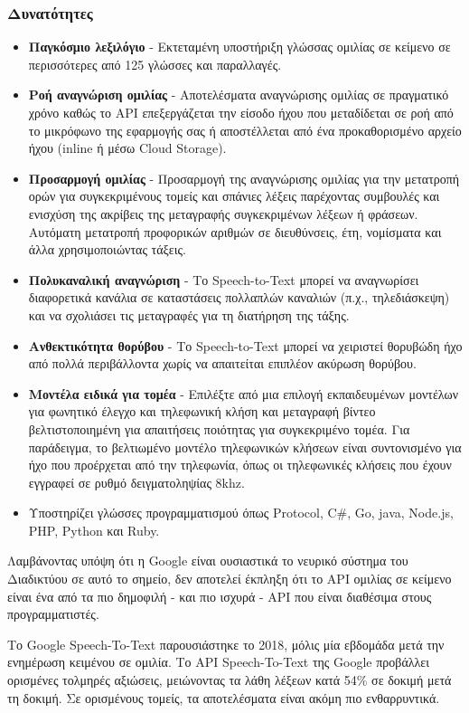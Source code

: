 \documentclass[oneside, 12pt]{book}
\begin{document}
\subsubsection{Δυνατότητες}
\begin{itemize}
  \item \textbf{Παγκόσμιο λεξιλόγιο} - Εκτεταμένη υποστήριξη γλώσσας ομιλίας σε κείμενο σε περισσότερες από 125 γλώσσες και παραλλαγές.
  \item \textbf{Ροή αναγνώριση ομιλίας} - Αποτελέσματα αναγνώρισης ομιλίας σε πραγματικό χρόνο καθώς το API επεξεργάζεται την είσοδο ήχου που μεταδίδεται σε ροή από το μικρόφωνο της εφαρμογής σας ή αποστέλλεται από ένα προκαθορισμένο αρχείο ήχου (inline ή μέσω Cloud Storage).
  \item \textbf{Προσαρμογή ομιλίας} - Προσαρμογή της αναγνώρισης ομιλίας για την μετατροπή ορών για συγκεκριμένους τομείς και σπάνιες λέξεις παρέχοντας συμβουλές και ενισχύση της ακρίβεις της μεταγραφής συγκεκριμένων λέξεων ή φράσεων. Αυτόματη μετατροπή προφορικών αριθμών σε διευθύνσεις, έτη, νομίσματα και άλλα χρησιμοποιώντας τάξεις.
  \item \textbf{Πολυκαναλική αναγνώριση} - Το Speech-to-Text μπορεί να αναγνωρίσει διαφορετικά κανάλια σε καταστάσεις πολλαπλών καναλιών (π.χ., τηλεδιάσκεψη) και να σχολιάσει τις μεταγραφές για τη διατήρηση της τάξης.
  \item \textbf{Ανθεκτικότητα θορύβου} - Το Speech-to-Text μπορεί να χειριστεί θορυβώδη ήχο από πολλά περιβάλλοντα χωρίς να απαιτείται επιπλέον ακύρωση θορύβου.
  \item \textbf{Μοντέλα ειδικά για τομέα} - Επιλέξτε από μια επιλογή εκπαιδευμένων μοντέλων για φωνητικό έλεγχο και τηλεφωνική κλήση και μεταγραφή βίντεο βελτιστοποιημένη για απαιτήσεις ποιότητας για συγκεκριμένο τομέα. Για παράδειγμα, το βελτιωμένο μοντέλο τηλεφωνικών κλήσεων είναι συντονισμένο για ήχο που προέρχεται από την τηλεφωνία, όπως οι τηλεφωνικές κλήσεις που έχουν εγγραφεί σε ρυθμό δειγματοληψίας 8khz.
  \item Υποστηρίζει γλώσσες προγραμματισμού όπως Protocol, C#, Go, java, Node.js, PHP, Python και Ruby.
\end{itemize}

Λαμβάνοντας υπόψη ότι η Google είναι ουσιαστικά το νευρικό σύστημα του Διαδικτύου σε αυτό το σημείο, δεν αποτελεί έκπληξη ότι το API ομιλίας σε κείμενο είναι ένα από τα πιο δημοφιλή - και πιο ισχυρά - API που είναι διαθέσιμα στους προγραμματιστές.

Το Google Speech-To-Text παρουσιάστηκε το 2018, μόλις μία εβδομάδα μετά την ενημέρωση κειμένου σε ομιλία. Το API Speech-To-Text της Google προβάλλει ορισμένες τολμηρές αξιώσεις, μειώνοντας τα λάθη λέξεων κατά 54\% σε δοκιμή μετά τη δοκιμή. Σε ορισμένους τομείς, τα αποτελέσματα είναι ακόμη πιο ενθαρρυντικά.
\end{document}
